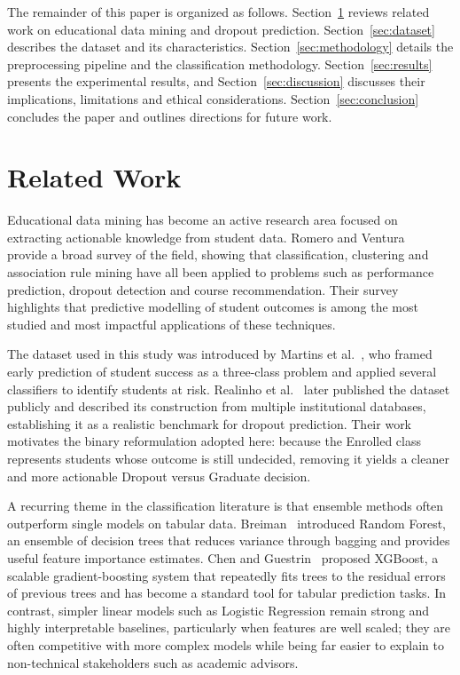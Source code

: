\documentclass[conference]{IEEEtran}
\begin{document}
	The remainder of this paper is organized as follows. Section~\ref{sec:related_work} reviews related work on educational data mining and dropout prediction. Section~\ref{sec:dataset} describes the dataset and its characteristics. Section~\ref{sec:methodology} details the preprocessing pipeline and the classification methodology. Section~\ref{sec:results} presents the experimental results, and Section~\ref{sec:discussion} discusses their implications, limitations and ethical considerations. Section~\ref{sec:conclusion} concludes the paper and outlines directions for future work.
	
	\section{Related Work}
	\label{sec:related_work}
	
	Educational data mining has become an active research area focused on extracting actionable knowledge from student data. Romero and Ventura~\cite{b1} provide a broad survey of the field, showing that classification, clustering and association rule mining have all been applied to problems such as performance prediction, dropout detection and course recommendation. Their survey highlights that predictive modelling of student outcomes is among the most studied and most impactful applications of these techniques.
	
	The dataset used in this study was introduced by Martins et al.~\cite{b2}, who framed early prediction of student success as a three-class problem and applied several classifiers to identify students at risk. Realinho et al.~\cite{b3} later published the dataset publicly and described its construction from multiple institutional databases, establishing it as a realistic benchmark for dropout prediction. Their work motivates the binary reformulation adopted here: because the Enrolled class represents students whose outcome is still undecided, removing it yields a cleaner and more actionable Dropout versus Graduate decision.
	
	A recurring theme in the classification literature is that ensemble methods often outperform single models on tabular data. Breiman~\cite{b4} introduced Random Forest, an ensemble of decision trees that reduces variance through bagging and provides useful feature importance estimates. Chen and Guestrin~\cite{b5} proposed XGBoost, a scalable gradient-boosting system that repeatedly fits trees to the residual errors of previous trees and has become a standard tool for tabular prediction tasks. In contrast, simpler linear models such as Logistic Regression remain strong and highly interpretable baselines, particularly when features are well scaled; they are often competitive with more complex models while being far easier to explain to non-technical stakeholders such as academic advisors.
	
\end{document}
